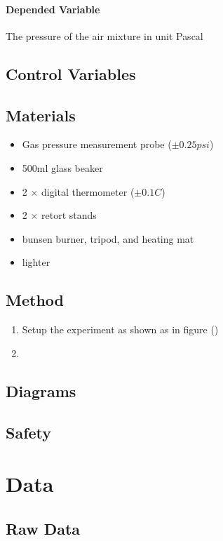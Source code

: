 \documentclass[a4paper,12pt]{article}
\begin{document}
\paragraph{Depended Variable}
The pressure of the air mixture in unit Pascal

\subsection{Control Variables}


\subsection{Materials}

\begin{itemize}
    \item Gas pressure measurement probe ($\pm 0.25\si{psi}$)
    \item 500ml glass beaker
    \item 2 $\times$ digital thermometer ($\pm 0.1\si{C}$)
    \item 2 $\times$ retort stands
    \item bunsen burner, tripod, and heating mat
    \item lighter
\end{itemize}

\subsection{Method}


\begin{enumerate}
    \item Setup the experiment as shown as in figure ()
    \item

\end{enumerate}


\subsection{Diagrams}
\subsection{Safety}

\section{Data}
\subsection{Raw Data}
\end{document}
